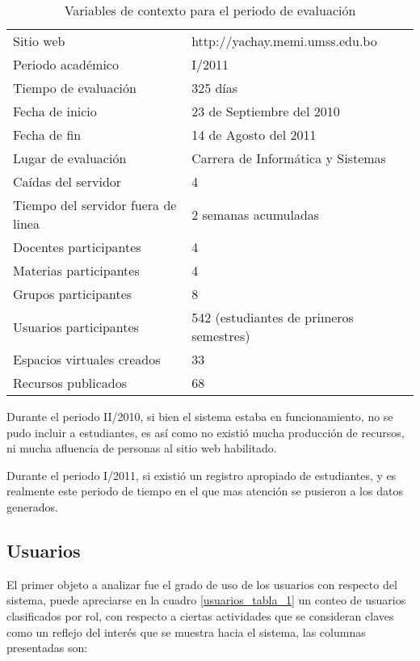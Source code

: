 \begin{table}
\centering
\begin{tabular}{|l|l|}
\hline
Sitio web                          & http://yachay.memi.umss.edu.bo \\
Periodo académico                  & I/2011 \\
Tiempo de evaluación               & 325 días \\
Fecha de inicio                    & 23 de Septiembre del 2010 \\
Fecha de fin                       & 14 de Agosto del 2011 \\
Lugar de evaluación                & Carrera de Informática y Sistemas \\
Caídas del servidor                & 4 \\
Tiempo del servidor fuera de linea & 2 semanas acumuladas \\
Docentes participantes             & 4 \\
Materias participantes             & 4 \\
Grupos participantes               & 8 \\
Usuarios participantes             & 542 (estudiantes de primeros semestres) \\
Espacios virtuales creados         & 33 \\
Recursos publicados                & 68 \\
\hline
\end{tabular}
\caption{Variables de contexto para el periodo de evaluación}
\label{contexto}
\end{table}

Durante el periodo II/2010, si bien el sistema estaba en funcionamiento, no se
pudo incluir a estudiantes, es así como no existió mucha producción de recursos,
ni mucha afluencia de personas al sitio web habilitado.

Durante el periodo I/2011, si existió un registro apropiado de estudiantes, y es
realmente este periodo de tiempo en el que mas atención se pusieron a los datos
generados.

\subsection{Usuarios}
El primer objeto a analizar fue el grado de uso de los usuarios con respecto del
sistema, puede apreciarse en la cuadro \ref{usuarios_tabla_1} un conteo de
usuarios clasificados por rol, con respecto a ciertas actividades que se consideran claves como un reflejo del interés que se muestra hacia el sistema, las
columnas presentadas son:

